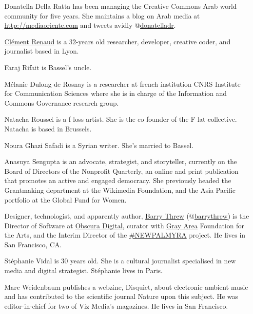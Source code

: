 \protect\hypertarget{donatella-della-ratta}{}{}Donatella Della Ratta has
been managing the Creative Commons Arab world community for five years.
She maintains a blog on Arab media at \url{http://mediaoriente.com} and
tweets avidly @\href{https://twitter.com/donatelladr}{donatelladr}.

\protect\hypertarget{clement-renaud}{}{}\href{http://clementrenaud.com}{Clément
Renaud} is a 32-years old researcher, developer, creative coder, and
journalist based in Lyon.

\protect\hypertarget{faraj-rifait}{}{}Faraj Rifait is Bassel's uncle.

\protect\hypertarget{melanie-dulong-de-rosnay}{}{}Mélanie Dulong de
Rosnay is a researcher at french institution CNRS Institute for
Communication Sciences where she is in charge of the Information and
Commons Governance research group.

\protect\hypertarget{natacha-roussel}{}{}Natacha Roussel is a f-loss
artist. She is the co-founder of the F-lat collective. Natacha is based
in Brussels.

\protect\hypertarget{noura-ghazi-safadi}{}{}Noura Ghazi Safadi is a
Syrian writer. She's married to Bassel.

\protect\hypertarget{anasuya-sengupta}{}{}Anasuya Sengupta is an
advocate, strategist, and storyteller, currently on the Board of
Directors of the Nonprofit Quarterly, an online and print publication
that promotes an active and engaged democracy. She previously headed the
Grantmaking department at the Wikimedia Foundation, and the Asia Pacific
portfolio at the Global Fund for Women.

\protect\hypertarget{barry-threw}{}{}Designer, technologist, and
apparently author, \href{http://www.barrythrew.com/}{Barry Threw}
(@\href{https://twitter.com/barrythrew}{barrythrew}) is the Director of
Software at \href{http://www.obscuradigital.com/}{Obscura Digital},
curator with \href{http://www.grayarea.org/}{Gray Area} Foundation for
the Arts, and the Interim Director of the \href{}{\#NEWPALMYRA} project.
He lives in San Francisco, CA.

\protect\hypertarget{stephanie-vidal}{}{}Stéphanie Vidal is 30 years
old. She is a cultural journalist specialised in new media and digital
strategist. Stéphanie lives in Paris.

\protect\hypertarget{marc-weidenbaum}{}{}Marc Weidenbaum publishes a
webzine, Disquiet, about electronic ambient music and has contributed to
the scientific journal Nature upon this subject. He was editor-in-chief
for two of Viz Media's magazines. He lives in San Francisco.

